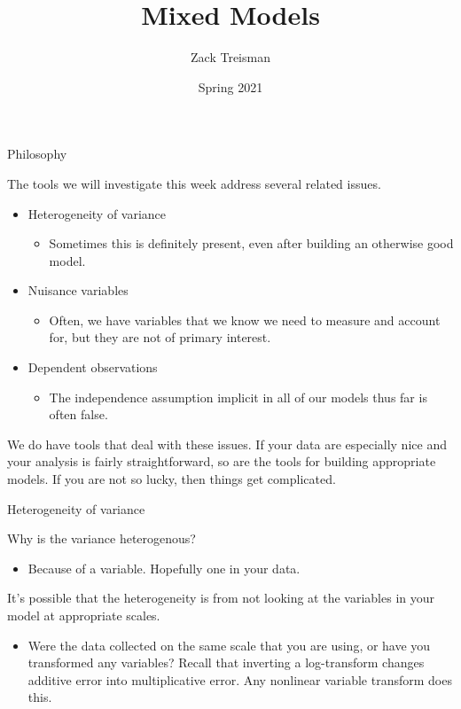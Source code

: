 \documentclass[
  ignorenonframetext,
]{beamer}
\title{Mixed Models}
\author{Zack Treisman}
\date{Spring 2021}
\providecommand{\tightlist}{%
  \setlength{\itemsep}{0pt}\setlength{\parskip}{0pt}}
\begin{document}
\frame{\titlepage}

\begin{frame}{Philosophy}
\protect\hypertarget{philosophy}{}

The tools we will investigate this week address several related issues.

\begin{itemize}
\tightlist
\item
  Heterogeneity of variance

  \begin{itemize}
  \tightlist
  \item
    Sometimes this is definitely present, even after building an
    otherwise good model.
  \end{itemize}
\item
  Nuisance variables

  \begin{itemize}
  \tightlist
  \item
    Often, we have variables that we know we need to measure and account
    for, but they are not of primary interest.
  \end{itemize}
\item
  Dependent observations

  \begin{itemize}
  \tightlist
  \item
    The independence assumption implicit in all of our models thus far
    is often false.
  \end{itemize}
\end{itemize}

We do have tools that deal with these issues. If your data are
especially nice and your analysis is fairly straightforward, so are the
tools for building appropriate models. If you are not so lucky, then
things get complicated.

\end{frame}

\begin{frame}{Heterogeneity of variance}
\protect\hypertarget{heterogeneity-of-variance}{}

Why is the variance heterogenous?

\begin{itemize}
\tightlist
\item
  Because of a variable. Hopefully one in your data.
\end{itemize}

It's possible that the heterogeneity is from not looking at the
variables in your model at appropriate scales.

\begin{itemize}
\tightlist
\item
  Were the data collected on the same scale that you are using, or have
  you transformed any variables? Recall that inverting a log-transform
  changes additive error into multiplicative error. Any nonlinear
  variable transform does this.
\end{itemize}

\end{frame}
\end{document}
